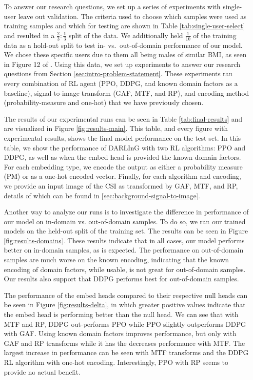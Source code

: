 To answer our research questions, we set up a series of experiments with single-user leave out validation.
The criteria used to choose which samples were used as training samples and which for testing are shown in Table \ref{tab:single-user-select} and resulted in a $\frac{2}{3}:\frac{1}{3}$ split of the data.
We additionally held $\frac{1}{10}$ of the training data as a hold-out split to test in- vs.\ out-of-domain performance of our model.
We chose these specific users due to them all being males of similar BMI, as seen in Figure 12 of \cite{zheng2019zero}.
Using this data, we set up experiments to answer our research questions from Section \ref{sec:intro-problem-statement}.
These experiments ran every combination of RL agent (PPO, DDPG, and known domain factors as a baseline), signal-to-image transform (GAF, MTF, and RP), and encoding method (probability-measure and one-hot) that we have previously chosen.

The results of our experimental runs can be seen in Table \ref{tab:final-results} and are visualized in Figure \ref{fig:results-main}.
This table, and every figure with experimental results, shows the final model performance on the test set.
In this table, we show the performance of DARLInG with two RL algorithms: PPO and DDPG, as well as when the embed head is provided the known domain factors.
For each embedding type, we encode the output as either a probability measure (PM) or as a one-hot encoded vector.
Finally, for each algorithm and encoding, we provide an input image of the CSI as transformed by GAF, MTF, and RP, details of which can be found in \ref{sec:background-signal-to-image}.

Another way to analyze our runs is to investigate the difference in performance of our model on in-domain vs. out-of-domain samples.
To do so, we ran our trained models on the held-out split of the training set.
The results can be seen in Figure \ref{fig:results-domains}.
These results indicate that in all cases, our model performs better on in-domain samples, as is expected.
The performance on out-of-domain samples are much worse on the known encoding, indicating that the known encoding of domain factors, while usable, is not great for out-of-domain samples.
Our results also support that DDPG performs best for out-of-domain samples.

The performance of the embed heads compared to their respective null heads can be seen in Figure \ref{fig:results-delta}, in which greater positive values indicate that the embed head is performing better than the null head.
We can see that with MTF and RP, DDPG out-performs PPO while PPO slightly outperforms DDPG with GAF.
Using known domain factors improves performance, but only with GAF and RP transforms while it has the decreases performance with MTF.
The largest increase in performance can be seen with MTF transforms and the DDPG RL algorithm with one-hot encoding.
Interestingly, PPO with RP seems to provide no actual benefit.

